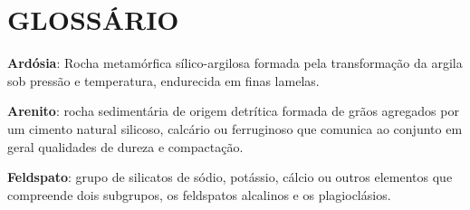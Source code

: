 






\chapter*{GLOSSÁRIO}

{ \setlength{\parindent}{0pt} %

	\textbf{Ardósia}: Rocha metamórfica sílico-argilosa formada pela transformação da argila sob pressão e temperatura, endurecida em finas lamelas.

	\textbf{Arenito}: rocha sedimentária de origem detrítica formada de grãos agregados por um cimento natural silicoso, calcário ou ferruginoso que comunica ao conjunto em geral qualidades de dureza e compactação.

	\textbf{Feldspato}: grupo de silicatos de sódio, potássio, cálcio ou outros elementos que compreende dois subgrupos, os feldspatos alcalinos e os plagioclásios.






} %


